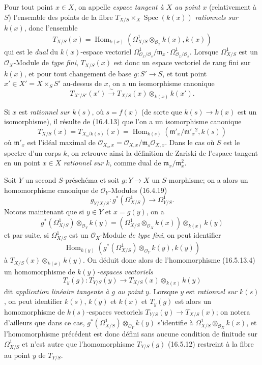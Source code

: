 \begin{env}[16.5.13]
Pour tout point $x\in X$, on appelle \emph{espace tangent à $X$ au point $x$}
(relativement à $S$) l'ensemble des points de la fibre
$T_{X/S}\times_X\operatorname{Spec}(k(x))$ \emph{rationnels sur $k(x)$}, donc
l'ensemble
\[
  T_{X/S}(x)=
  \operatorname{Hom}_{k(x)}
  (\Omega_{X/S}^1\otimes_{\mathcal{O}_x}k(x),k(x))
  \tag{16.5.13.1}
  \label{IV.16.5.13.1}
\]
qui est le \emph{dual} du $k(x)$-espace vectoriel
$\Omega_{\mathcal{O}_x/\mathcal{O}_s}^1/
\mathfrak{m}_x\cdot\Omega_{\mathcal{O}_x/\mathcal{O}_s}^1$. Lorsque
$\Omega_{X/S}^1$ est un $\mathcal{O}_X$-Module de \emph{type fini},
$T_{X/S}(x)$ est donc un espace vectoriel de rang fini sur $k(x)$, et pour
tout
changement de base $g:S'\to S$, et tout point
$x'\in X'=X\times_S S'$ au-dessus de $x$, on a un isomorphisme canonique
\[
  T_{X'/S'}(x')\xrightarrow{\sim}
  T_{X/S}(x)\otimes_{k(x)}k(x').
  \tag{16.5.13.2}
  \label{IV.16.5.13.2}
\]

Si $x$ est \emph{rationnel sur $k(s)$}, où $s=f(x)$ (de sorte que
$k(s)\to k(x)$ est un isomorphisme), il résulte de (16.4.13) que l'on a un
isomorphisme canonique
\[
  T_{X/S}(x)=T_{X_s/k(s)}(x)
  =\operatorname{Hom}_{k(s)}
  (\mathfrak{m}'_x/\mathfrak{m}'_x{}^2,k(s))
  \tag{16.5.13.3}
  \label{IV.16.5.13.3}
\]
où $\mathfrak{m}'_x$ est l'idéal maximal de
$\mathcal{O}_{X_s,x}=\mathcal{O}_{X,x}/
\mathfrak{m}_s\mathcal{O}_{X,x}$. Dans le cas où $S$ est le spectre d'un corps
$k$, on retrouve ainsi la définition de Zariski de l'espace tangent en un
point $x\in X$ \emph{rationnel sur $k$}, comme dual de
$\mathfrak{m}_x/\mathfrak{m}_x^2$.

Soit $Y$ un second $S$-préschéma et soit $g:Y\to X$ un $S$-morphisme; on a
alors un homomorphisme canonique de $\mathcal{O}_Y$-Modules (16.4.19)
\[
  g_{Y/X/S}:g^*(\Omega_{X/S}^1)\longrightarrow\Omega_{Y/S}^1.
  \tag{16.5.13.4}
  \label{IV.16.5.13.4}
\]
Notons maintenant que si $y\in Y$ et $x=g(y)$, on a
\[
  g^*(\Omega_{X/S}^1)\otimes_{\mathcal{O}_Y}k(y)
  =(\Omega_{X/S}^1\otimes_{\mathcal{O}_X}k(x))
  \otimes_{k(x)}k(y)
\]
et par suite, si $\Omega_{X/S}^1$ est un $\mathcal{O}_X$-Module
\emph{de type fini}, on peut identifier
\[
  \operatorname{Hom}_{k(y)}
  (g^*(\Omega_{X/S}^1)\otimes_{\mathcal{O}_Y}k(y),k(y))
\]
à $T_{X/S}(x)\otimes_{k(x)}k(y)$. On déduit donc alors de l'homomorphisme
(16.5.13.4) un homomorphisme de \emph{$k(y)$-espaces vectoriels}
\[
  T_y(g):T_{Y/S}(y)\longrightarrow
  T_{X/S}(x)\otimes_{k(x)}k(y)
  \tag{16.5.13.5}
  \label{IV.16.5.13.5}
\]
dit \emph{application linéaire tangente à $g$ au point $y$}. Lorsque $y$ est
\emph{rationnel sur $k(s)$}, on peut identifier $k(s)$, $k(y)$ et $k(x)$ et
$T_y(g)$ est alors un homomorphisme de $k(s)$-espaces vectoriels
$T_{Y/S}(y)\to T_{X/S}(x)$; on notera d'ailleurs que dans ce cas,
$g^*(\Omega_{X/S}^1)\otimes_{\mathcal{O}_Y}k(y)$ s'identifie à
$\Omega_{X/S}^1\otimes_{\mathcal{O}_X}k(x)$, et l'homomorphisme précédent est
donc défini sans aucune condition de finitude sur $\Omega_{X/S}^1$ et n'est
autre que l'homomorphisme $T_{Y/S}(g)$ (16.5.12) restreint à la fibre au point
$y$ de $T_{Y/S}$.
\end{env}

